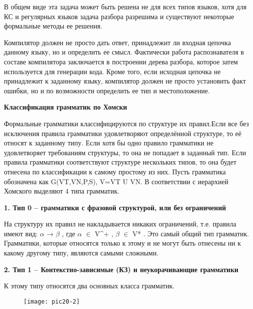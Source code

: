   В общем виде эта задача может быть решена не для всех типов языков, хотя для КС и регулярных языков задача разбора разрешима и существуют некоторые формальные методы ее решения.

  Компилятор должен не просто дать ответ, принадлежит ли входная цепочка данному языку, но и определить ее смысл. Фактически работа распознавателя в составе компилятора заключается в построении дерева разбора, которое затем используется для генерации кода. Кроме того, если исходная цепочка не принадлежит к заданному языку, компилятор должен не просто установить факт ошибки, но и по возможности определить ее тип и местоположение.

\begin{center}{\bfseries Классификация грамматик по Хомски}
\end{center}

Формальные грамматики классифицируются по структуре их правил.Если все без исключения правила грамматики удовлетворяют определённой структуре, то её относят к заданному типу. Если хотя бы одно правило грамматики не удовлетворяет требованиям структуры, то она не попадает в заданный тип. Если правила грамматики соответствуют структуре нескольких типов, то она будет отнесена по классификации к самому простому из них. Пусть грамматика обозначена как G(VT,VN,P,S), V=VT U VN. В соответствии с иерархией Хомского выделяют 4 типа грамматик.

\begin{center}{\bfseries 1. Тип 0 – грамматики с фразовой структурой, или без ограничений}
\end{center}

На структуру их правил не накладывается никаких ограничений, т.е. правила имеют вид: $\alpha$ → $\beta$ , где $\alpha$ $\in$ V^{+} , $\beta$ $\in$ V* . Это самый общий тип грамматик. Грамматики, которые относятся только к этому и не могут быть отнесены ни к какому другому типу, являются самыми сложными.

\begin{center}{\bfseries 2. Тип 1 – Контекстно-зависимые (КЗ) и неукорачивающие грамматики}
\end{center}

К этому типу относятся два основных класса грамматик.

\begin{figure}[h]
  \begin{center}
  \texttt{[image: pic20-2]}
  \end{center}
\end{figure}

